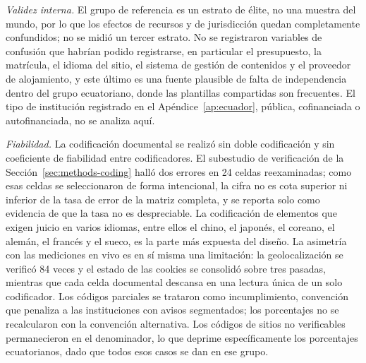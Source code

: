 \documentclass[pdflatex,sn-basic,Numbered,iicol]{sn-jnl}
\theoremstyle{thmstyleone}
\theoremstyle{thmstyletwo}
\theoremstyle{thmstylethree}
\begin{document}
\emph{Validez interna.} El grupo de referencia es un estrato de \'elite, no una muestra del mundo, por lo que los efectos de recursos y de jurisdicci\'on quedan completamente confundidos; no se midi\'o un tercer estrato. No se registraron variables de confusi\'on que habr\'ian podido registrarse, en particular el presupuesto, la matr\'icula, el idioma del sitio, el sistema de gesti\'on de contenidos y el proveedor de alojamiento, y este \'ultimo es una fuente plausible de falta de independencia dentro del grupo ecuatoriano, donde las plantillas compartidas son frecuentes. El tipo de instituci\'on registrado en el Ap\'endice~\ref{ap:ecuador}, p\'ublica, cofinanciada o autofinanciada, no se analiza aqu\'i.

\emph{Fiabilidad.} La codificaci\'on documental se realiz\'o sin doble codificaci\'on y sin coeficiente de fiabilidad entre codificadores. El subestudio de verificaci\'on de la Secci\'on~\ref{sec:methods-coding} hall\'o dos errores en 24 celdas reexaminadas; como esas celdas se seleccionaron de forma intencional, la cifra no es cota superior ni inferior de la tasa de error de la matriz completa, y se reporta solo como evidencia de que la tasa no es despreciable. La codificaci\'on de elementos que exigen juicio en varios idiomas, entre ellos el chino, el japon\'es, el coreano, el alem\'an, el franc\'es y el sueco, es la parte m\'as expuesta del dise\~no. La asimetr\'ia con las mediciones en vivo es en s\'i misma una limitaci\'on: la geolocalizaci\'on se verific\'o 84 veces y el estado de las cookies se consolid\'o sobre tres pasadas, mientras que cada celda documental descansa en una lectura \'unica de un solo codificador. Los c\'odigos parciales se trataron como incumplimiento, convenci\'on que penaliza a las instituciones con avisos segmentados; los porcentajes no se recalcularon con la convenci\'on alternativa. Los c\'odigos de sitios no verificables permanecieron en el denominador, lo que deprime espec\'ificamente los porcentajes ecuatorianos, dado que todos esos casos se dan en ese grupo.
\end{document}
